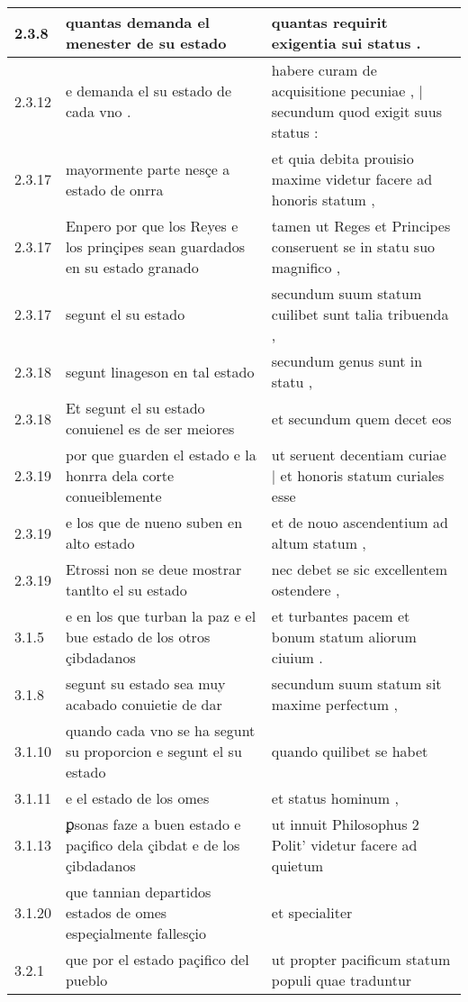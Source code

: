 \begin{tabular}{|p{1cm}|p{6.5cm}|p{6.5cm}|}
2.3.8 & quantas demanda el menester de su estado & quantas requirit exigentia sui status . \\\hline
2.3.12 & e demanda el su estado de cada vno . & habere curam de acquisitione pecuniae , | secundum quod exigit suus status : \\\hline
2.3.17 & mayormente parte nesçe a estado de onrra & et quia debita prouisio maxime videtur facere ad honoris statum , \\\hline
2.3.17 & Enpero por que los Reyes e los prinçipes sean guardados en su estado granado & tamen ut Reges et Principes conseruent se in statu suo magnifico , \\\hline
2.3.17 & segunt el su estado & secundum suum statum cuilibet sunt talia tribuenda , \\\hline
2.3.18 & segunt linageson en tal estado & secundum genus sunt in statu , \\\hline
2.3.18 & Et segunt el su estado conuienel es de ser meiores & et secundum quem decet eos \\\hline
2.3.19 & por que guarden el estado e la honrra dela corte conueiblemente & ut seruent decentiam curiae | et honoris statum curiales esse \\\hline
2.3.19 & e los que de nueno suben en alto estado & et de nouo ascendentium ad altum statum , \\\hline
2.3.19 & Etrossi non se deue mostrar tantlto el su estado & nec debet se sic excellentem ostendere , \\\hline
3.1.5 & e en los que turban la paz e el bue estado de los otros çibdadanos & et turbantes pacem et bonum statum aliorum ciuium . \\\hline
3.1.8 & segunt su estado sea muy acabado conuietie de dar & secundum suum statum sit maxime perfectum , \\\hline
3.1.10 & quando cada vno se ha segunt su proporcion e segunt el su estado & quando quilibet se habet \\\hline
3.1.11 & e el estado de los omes & et status hominum , \\\hline
3.1.13 & ꝑsonas faze a buen estado e paçifico dela çibdat e de los çibdadanos & ut innuit Philosophus 2 Polit’ videtur facere ad quietum \\\hline
3.1.20 & que tannian departidos estados de omes espeçialmente fallesçio & et specialiter \\\hline
3.2.1 & que por el estado paçifico del pueblo & ut propter pacificum statum populi quae traduntur \\\hline

\end{tabular}
